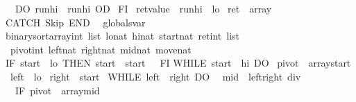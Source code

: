 \begin{isabellebody}
\ \ DO\ {\isasymacute}run{\isacharunderscore}hi\ {\isacharcolon}{\isacharequal}{\isacharequal}\ {\isasymacute}run{\isacharunderscore}hi{\isacharplus}{}\ OD\isanewline
\ FI{\isacharsemicolon}{\isacharsemicolon}\isanewline
\ {\isasymacute}ret{\isacharunderscore}value\ {\isacharcolon}{\isacharequal}{\isacharequal}\ {\isasymacute}run{\isacharunderscore}hi\ {\isacharminus}\ {\isasymacute}lo{\isacharsemicolon}{\isacharsemicolon}\isanewline
\ {\isasymacute}ret\ {\isacharcolon}{\isacharequal}{\isacharequal}\ {\isasymacute}array\isanewline
CATCH\ Skip\ END{\isachardoublequoteclose}\isanewline
\isanewline
{}\isamarkupfalse%
\ {\isacharparenleft}\ globals{\isacharunderscore}var{\isacharparenright}\isanewline
binary{\isacharunderscore}sort{\isacharparenleft}array{\isacharcolon}{\isacharcolon}{\isachardoublequoteopen}int\ list{\isachardoublequoteclose}{\isacharcomma}\ lo{\isacharcolon}{\isacharcolon}nat{\isacharcomma}\ hi{\isacharcolon}{\isacharcolon}nat{\isacharcomma}\ start{\isacharcolon}{\isacharcolon}nat{\isacharbar}\ ret{\isacharcolon}{\isacharcolon}{\isachardoublequoteopen}int\ list{\isachardoublequoteclose}{\isacharparenright}\isanewline
{}\ pivot{\isacharcolon}{\isacharcolon}int\ left{\isacharcolon}{\isacharcolon}nat\ right{\isacharcolon}{\isacharcolon}nat\ mid{\isacharcolon}{\isacharcolon}nat\ move{\isacharcolon}{\isacharcolon}nat\ \isanewline
{\isachardoublequoteopen}\isanewline
IF\ {\isasymacute}start\ {\isacharequal}\ {\isasymacute}lo\ THEN\ {\isasymacute}start\ {\isacharcolon}{\isacharequal}{\isacharequal}\ {\isasymacute}start\ {\isacharplus}\ {}\ FI{\isacharsemicolon}{\isacharsemicolon}\isanewline
WHILE\ {\isasymacute}start\ {\isacharless}\ {\isasymacute}hi\ DO\isanewline
\ {\isasymacute}pivot\ {\isacharcolon}{\isacharequal}{\isacharequal}\ {\isasymacute}array{\isacharbang}{\isasymacute}start{\isacharsemicolon}{\isacharsemicolon}\isanewline
\ {\isasymacute}left\ {\isacharcolon}{\isacharequal}{\isacharequal}\ {\isasymacute}lo{\isacharsemicolon}{\isacharsemicolon}\isanewline
\ {\isasymacute}right\ {\isacharcolon}{\isacharequal}{\isacharequal}\ {\isasymacute}start{\isacharsemicolon}{\isacharsemicolon}\isanewline
\ WHILE\ {\isasymacute}left\ {\isacharless}\ {\isasymacute}right\ DO\isanewline
\ \ {\isasymacute}mid\ {\isacharcolon}{\isacharequal}{\isacharequal}\ {\isacharparenleft}{\isasymacute}left{\isacharplus}{\isasymacute}right{\isacharparenright}\ div\ {}{\isacharsemicolon}{\isacharsemicolon}\isanewline
\ \ IF\ {\isasymacute}pivot\ {\isacharless}\ {\isasymacute}array{\isacharbang}{\isasymacute}mid\ \isanewline

\end{isabellebody}
